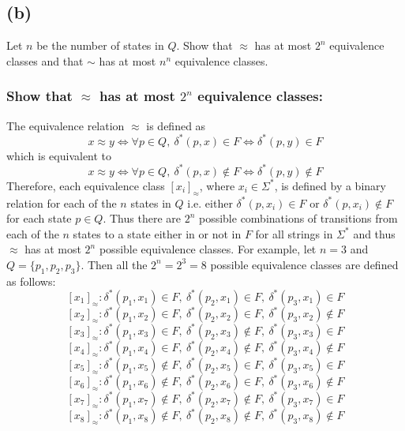 \documentclass[12pt]{article}
\begin{document}
\newpage
\subsection*{(b)}Let $n$ be the number of states in $Q$. Show that $\approx$
has at most $2^{n}$ equivalence classes and that $\sim$ has at most $n^{n}$
equivalence classes.
\subsubsection*{Show that $\approx$ has at most $2^n$ equivalence classes:}
The equivalence relation $\approx$ is defined as
$$x \approx y \iff \forall p \in Q,
\ \delta^*(p,x) \in F \iff \delta^*(p,y) \in F$$
which is equivalent to
$$x \approx y \iff \forall p \in Q,
\ \delta^*(p,x) \notin F \iff \delta^*(p,y) \notin F$$
Therefore, each equivalence class $[x_i]_{\approx}$, where $x_i \in \Sigma^*$,
is defined by a binary relation for each of the $n$ states in $Q$
i.e. either $\delta^*(p, x_i) \in F \text{ or } \delta^*(p,x_i) \notin F$
for each state $p \in Q$. Thus there are $2^n$ possible combinations of
transitions from each of the $n$ states to a state either in or not in $F$
for all strings in $\Sigma^*$ and thus $\approx$ has at most $2^n$ possible
equivalence classes.
\vspace{5 mm}
\newline
For example, let $n = 3$ and $Q = \{p_1, p_2, p_3\}.$ Then all the
$2^n = 2^3 = 8$ possible equivalence classes are defined as follows:
$$[x_1]_{\approx} : \delta^*(p_1, x_1) \in F,\ \delta^*(p_2, x_1) \in F,\ \delta^*(p_3, x_1) \in F$$
$$[x_2]_{\approx} : \delta^*(p_1, x_2) \in F,\ \delta^*(p_2, x_2) \in F,\ \delta^*(p_3, x_2) \notin F$$
$$[x_3]_{\approx} : \delta^*(p_1, x_3) \in F,\ \delta^*(p_2, x_3) \notin F,\ \delta^*(p_3, x_3) \in F$$
$$[x_4]_{\approx} : \delta^*(p_1, x_4) \in F,\ \delta^*(p_2, x_4) \notin F,\ \delta^*(p_3, x_4) \notin F$$
$$[x_5]_{\approx} : \delta^*(p_1, x_5) \notin F,\ \delta^*(p_2, x_5) \in F,\ \delta^*(p_3, x_5) \in F$$
$$[x_6]_{\approx} : \delta^*(p_1, x_6) \notin F,\ \delta^*(p_2, x_6) \in F,\ \delta^*(p_3, x_6) \notin F$$
$$[x_7]_{\approx} : \delta^*(p_1, x_7) \notin F,\ \delta^*(p_2, x_7) \notin F,\ \delta^*(p_3, x_7) \in F$$
$$[x_8]_{\approx} : \delta^*(p_1, x_8) \notin F,\ \delta^*(p_2, x_8) \notin F,\ \delta^*(p_3, x_8) \notin F$$
\end{document}

